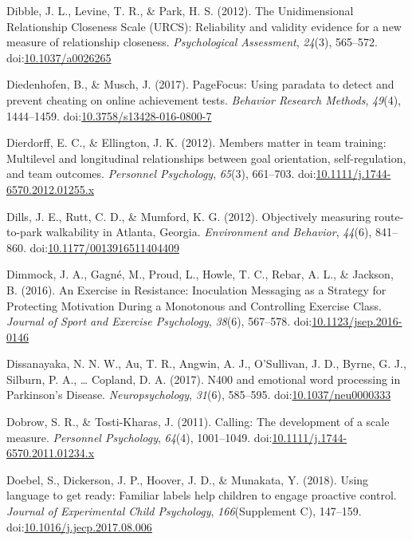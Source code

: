 \documentclass[english,man]{apa6}
\begin{document}
\hypertarget{ref-Dibble2012}{}
Dibble, J. L., Levine, T. R., \& Park, H. S. (2012). The Unidimensional
Relationship Closeness Scale (URCS): Reliability and validity evidence
for a new measure of relationship closeness. \emph{Psychological
Assessment}, \emph{24}(3), 565--572.
doi:\href{https://doi.org/10.1037/a0026265}{10.1037/a0026265}

\hypertarget{ref-Diedenhofen2017}{}
Diedenhofen, B., \& Musch, J. (2017). PageFocus: Using paradata to
detect and prevent cheating on online achievement tests. \emph{Behavior
Research Methods}, \emph{49}(4), 1444--1459.
doi:\href{https://doi.org/10.3758/s13428-016-0800-7}{10.3758/s13428-016-0800-7}

\hypertarget{ref-Dierdorff2012}{}
Dierdorff, E. C., \& Ellington, J. K. (2012). Members matter in team
training: Multilevel and longitudinal relationships between goal
orientation, self-regulation, and team outcomes. \emph{Personnel
Psychology}, \emph{65}(3), 661--703.
doi:\href{https://doi.org/10.1111/j.1744-6570.2012.01255.x}{10.1111/j.1744-6570.2012.01255.x}

\hypertarget{ref-Dills2012}{}
Dills, J. E., Rutt, C. D., \& Mumford, K. G. (2012). Objectively
measuring route-to-park walkability in Atlanta, Georgia.
\emph{Environment and Behavior}, \emph{44}(6), 841--860.
doi:\href{https://doi.org/10.1177/0013916511404409}{10.1177/0013916511404409}

\hypertarget{ref-Dimmock2016}{}
Dimmock, J. A., Gagné, M., Proud, L., Howle, T. C., Rebar, A. L., \&
Jackson, B. (2016). An Exercise in Resistance: Inoculation Messaging as
a Strategy for Protecting Motivation During a Monotonous and Controlling
Exercise Class. \emph{Journal of Sport and Exercise Psychology},
\emph{38}(6), 567--578.
doi:\href{https://doi.org/10.1123/jsep.2016-0146}{10.1123/jsep.2016-0146}

\hypertarget{ref-Dissanayaka2017}{}
Dissanayaka, N. N. W., Au, T. R., Angwin, A. J., O'Sullivan, J. D.,
Byrne, G. J., Silburn, P. A., \ldots{} Copland, D. A. (2017). N400 and
emotional word processing in Parkinson's Disease.
\emph{Neuropsychology}, \emph{31}(6), 585--595.
doi:\href{https://doi.org/10.1037/neu0000333}{10.1037/neu0000333}

\hypertarget{ref-Dobrow2011}{}
Dobrow, S. R., \& Tosti-Kharas, J. (2011). Calling: The development of a
scale measure. \emph{Personnel Psychology}, \emph{64}(4), 1001--1049.
doi:\href{https://doi.org/10.1111/j.1744-6570.2011.01234.x}{10.1111/j.1744-6570.2011.01234.x}

\hypertarget{ref-Doebel2018}{}
Doebel, S., Dickerson, J. P., Hoover, J. D., \& Munakata, Y. (2018).
Using language to get ready: Familiar labels help children to engage
proactive control. \emph{Journal of Experimental Child Psychology},
\emph{166}(Supplement C), 147--159.
doi:\href{https://doi.org/10.1016/j.jecp.2017.08.006}{10.1016/j.jecp.2017.08.006}
\end{document}
